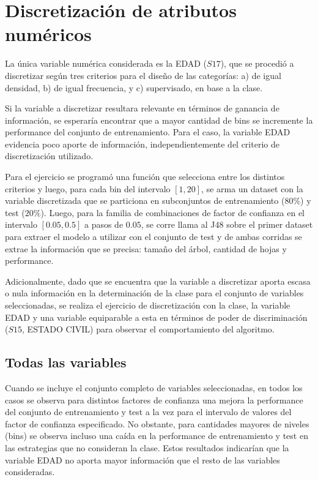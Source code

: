 \documentclass[]{article}
\begin{document}
\section{Discretización de atributos numéricos}
La única variable numérica considerada es la EDAD ($S17$), que se procedió a discretizar según tres criterios para el diseño de las categorías: a) de igual densidad, b) de igual frecuencia, y c) supervisado, en base a la clase.

Si la variable a discretizar resultara relevante en términos de ganancia de información, se esperaría encontrar que a mayor cantidad de bins se incremente la performance del conjunto de entrenamiento. Para el caso, la variable EDAD evidencia poco aporte de información, independientemente del criterio de discretización utilizado. 

Para el ejercicio se programó una función que selecciona entre los distintos criterios y luego, para cada bin del intervalo $[1,20]$, se arma un dataset con la variable discretizada que se particiona en subconjuntos de entrenamiento ($80\%$) y test ($20\%$). Luego, para la familia de combinaciones de factor de confianza en el intervalo $[0.05,0.5]$ a pasos de $0.05$, se corre llama al J48 sobre el primer dataset para extraer el modelo a utilizar con el conjunto de test y de ambas corridas se extrae la información que se precisa: tamaño del árbol, cantidad de hojas y performance.

Adicionalmente, dado que se encuentra que la variable a discretizar aporta escasa o nula información en la determinación de la clase para el conjunto de variables seleccionadas, se realiza el ejercicio de discretización con la clase, la variable EDAD y una variable equiparable a esta en términos de poder de discriminación ($S15$, ESTADO CIVIL) para observar el comportamiento del algoritmo.

\subsection{Todas las variables}
Cuando se incluye el conjunto completo de variables seleccionadas, en todos los casos se observa para distintos factores de confianza una mejora la performance del conjunto de entrenamiento y test a la vez para el intervalo de valores del factor de confianza especificado. No obstante, para cantidades mayores de niveles (bins) se observa incluso una caída en la performance de entrenamiento y test en las estrategias que no consideran la clase. Estos resultados indicarían que la variable EDAD no aporta mayor información que el resto de las variables consideradas.  
\end{document}
